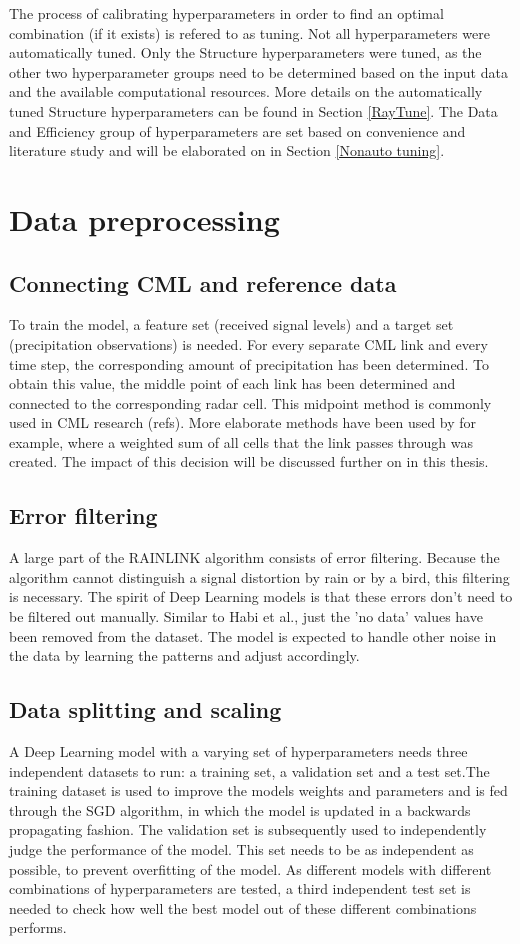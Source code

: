 \documentclass[twocolumn, 10pt, a4paper]{memoir}
\begin{document}
	The process of calibrating hyperparameters in order to find an optimal combination (if it exists) is refered to as tuning. Not all hyperparameters were automatically tuned. Only the Structure hyperparameters were tuned, as the other two hyperparameter groups need to be determined based on the input data and the available computational resources. More details on the automatically tuned Structure hyperparameters can be found in Section \ref{RayTune}. The Data and Efficiency group of hyperparameters are set based on convenience and literature study and will be elaborated on in Section \ref{Nonauto tuning}.
	
	
	\section{Data preprocessing} \label{sec: datapreprocess}
	\subsection{Connecting CML and reference data}
	To train the model, a feature set (received signal levels) and a target set (precipitation observations) is needed. For every separate CML link and every time step, the corresponding amount of precipitation has been determined. To obtain this value, the middle point of each link has been determined and connected to the corresponding radar cell. This midpoint method is commonly used in CML research (refs). More elaborate methods have been used by  for example, where a weighted sum of all cells that the link passes through was created. The impact of this decision will be discussed further on in this thesis.
	\subsection{Error filtering}
	A large part of the RAINLINK algorithm consists of error filtering. Because the algorithm cannot distinguish a signal distortion by rain or by a bird, this filtering is necessary. The spirit of Deep Learning models is that these errors don't need to be filtered out manually. Similar to Habi et al., just the 'no data' values have been removed from the dataset. The model is expected to handle other noise in the data by learning the patterns and adjust accordingly.
	\subsection{Data splitting and scaling}
	A Deep Learning model with a varying set of hyperparameters needs three independent datasets to run: a training set, a validation set and a test set.The training dataset is used to improve the models weights and parameters and is fed through the SGD algorithm, in which the model is updated in a backwards propagating fashion. The validation set is subsequently used to independently judge the performance of the model. This set needs to be as independent as possible, to prevent overfitting of the model.
	As different models with different combinations of hyperparameters are tested, a third independent test set is needed to check how well the best model out of these different combinations performs.  
	
\end{document}
